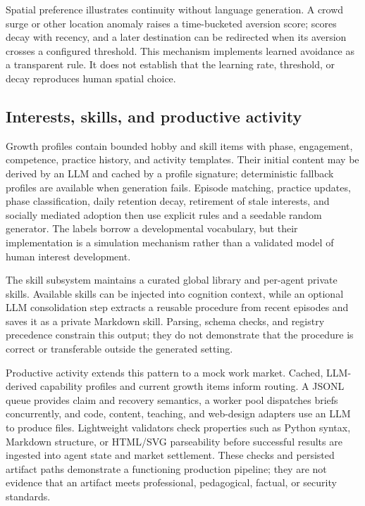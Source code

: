Spatial preference illustrates continuity without language generation.  A
crowd surge or other location anomaly raises a time-bucketed aversion score;
scores decay with recency, and a later destination can be redirected when its
aversion crosses a configured threshold.  This mechanism implements learned
avoidance as a transparent rule.  It does not establish that the learning rate,
threshold, or decay reproduces human spatial choice.

\subsection{Interests, skills, and productive activity}

Growth profiles contain bounded hobby and skill items with phase, engagement,
competence, practice history, and activity templates.  Their initial content
may be derived by an LLM and cached by a profile signature; deterministic
fallback profiles are available when generation fails.  Episode matching,
practice updates, phase classification, daily retention decay, retirement of
stale interests, and socially mediated adoption then use explicit rules and a
seedable random generator.  The labels borrow a developmental vocabulary, but
their implementation is a simulation mechanism rather than a validated model
of human interest development.

The skill subsystem maintains a curated global library and per-agent private
skills.  Available skills can be injected into cognition context, while an
optional LLM consolidation step extracts a reusable procedure from recent
episodes and saves it as a private Markdown skill.  Parsing, schema checks, and
registry precedence constrain this output; they do not demonstrate that the
procedure is correct or transferable outside the generated setting.

Productive activity extends this pattern to a mock work market.  Cached,
LLM-derived capability profiles and current growth items inform routing.  A
JSONL queue provides claim and recovery semantics, a worker pool dispatches
briefs concurrently, and code, content, teaching, and web-design adapters use
an LLM to produce files.  Lightweight validators check properties such as
Python syntax, Markdown structure, or HTML/SVG parseability before successful
results are ingested into agent state and market settlement.  These checks and
persisted artifact paths demonstrate a functioning production pipeline; they
are not evidence that an artifact meets professional, pedagogical, factual, or
security standards.
